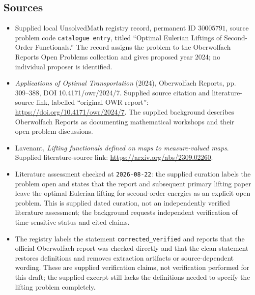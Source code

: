 \documentclass[11pt]{article}
\begin{document}
\subsection{Sources}
\begin{itemize}
\item Supplied local UnsolvedMath registry record, permanent ID \(30005791\), source problem code \texttt{catalogue entry}, titled ``Optimal Eulerian Liftings of Second-Order Functionals.'' The record assigns the problem to the Oberwolfach Reports Open Problems collection and gives proposed year 2024; no individual proposer is identified.
\item \emph{Applications of Optimal Transportation} (2024), Oberwolfach Reports, pp. 309--388, DOI 10.4171/owr/2024/7. Supplied source citation and literature-source link, labelled ``original OWR report'': \url{https://doi.org/10.4171/owr/2024/7}. The supplied background describes Oberwolfach Reports as documenting mathematical workshops and their open-problem discussions.
\item Lavenant, \emph{Lifting functionals defined on maps to measure-valued maps}. Supplied literature-source link: \url{https://arxiv.org/abs/2309.02260}.
\item Literature assessment checked at \texttt{2026-08-22}: the supplied curation labels the problem open and states that the report and subsequent primary lifting paper leave the optimal Eulerian lifting for second-order energies as an explicit open problem. This is supplied dated curation, not an independently verified literature assessment; the background requests independent verification of time-sensitive status and cited claims.
\item The registry labels the statement \texttt{corrected\_verified} and reports that the official Oberwolfach report was checked directly and that the clean statement restores definitions and removes extraction artifacts or source-dependent wording. These are supplied verification claims, not verification performed for this draft; the supplied excerpt still lacks the definitions needed to specify the lifting problem completely.
\end{itemize}
\end{document}

